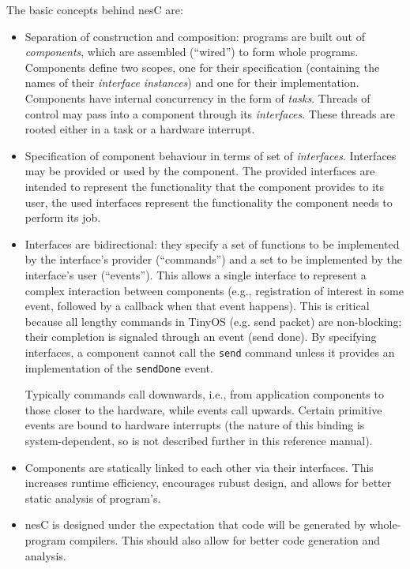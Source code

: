 \documentclass[11pt]{article}
\newcommand{\nesc}{nesC\xspace}
\begin{document}
The basic concepts behind \nesc are:
\begin{itemize}
\item Separation of construction and composition: programs are built out of
\emph{components}, which are assembled (``wired'') to form whole
programs. Components define two scopes, one for their specification
(containing the names of their \emph{interface instances}) and one for
their implementation. Components have internal concurrency in the form of
\emph{tasks}. Threads of control may pass into a component through its
\emph{interfaces}. These threads are rooted either in a task or a hardware
interrupt.

\item Specification of component behaviour in terms of set of
\emph{interfaces}. Interfaces may be provided or used by the component. The
provided interfaces are intended to represent the functionality that the
component provides to its user, the used interfaces represent the
functionality the component needs to perform its job.

\item Interfaces are bidirectional: they specify a set of functions to be
implemented by the interface's provider (``commands'') and a set to be
implemented by the interface's user (``events''). This allows a single
interface to represent a complex interaction between components (e.g.,
registration of interest in some event, followed by a callback when
that event happens). This is critical because all lengthy commands in
TinyOS (e.g. send packet) are non-blocking; their completion is
signaled through an event (send done). By specifying interfaces, a
component cannot call the {\tt send} command unless it provides an
implementation of the {\tt sendDone} event.

Typically commands call downwards, i.e., from application components to
those closer to the hardware, while events call upwards. Certain primitive
events are bound to hardware interrupts (the nature of this binding is
system-dependent, so is not described further in this reference manual).

\item Components are statically linked to each other via their interfaces.
This increases runtime efficiency, encourages rubust design, and allows for
better static analysis of program's.

\item \nesc is designed under the expectation that code will be generated
by whole-program compilers. This should also allow for better code 
generation and analysis.
\end{itemize}
\end{document}
